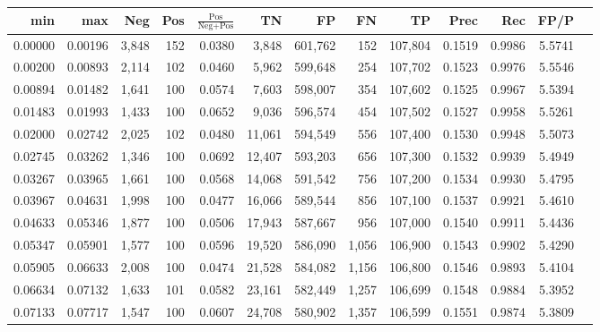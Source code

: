 \begin{tabular}{rrrrrrrrrrrrr}
\toprule
    min &     max &   Neg & Pos & $\frac{\text{Pos}}{\text{Neg}+\text{Pos}}$ &      TN &      FP &      FN &      TP &   Prec &    Rec &   FP/P \\
\midrule
0.00000 & 0.00196 & 3,848 & 152 &                                     0.0380 &   3,848 & 601,762 &     152 & 107,804 & 0.1519 & 0.9986 & 5.5741 \\
0.00200 & 0.00893 & 2,114 & 102 &                                     0.0460 &   5,962 & 599,648 &     254 & 107,702 & 0.1523 & 0.9976 & 5.5546 \\
0.00894 & 0.01482 & 1,641 & 100 &                                     0.0574 &   7,603 & 598,007 &     354 & 107,602 & 0.1525 & 0.9967 & 5.5394 \\
0.01483 & 0.01993 & 1,433 & 100 &                                     0.0652 &   9,036 & 596,574 &     454 & 107,502 & 0.1527 & 0.9958 & 5.5261 \\
0.02000 & 0.02742 & 2,025 & 102 &                                     0.0480 &  11,061 & 594,549 &     556 & 107,400 & 0.1530 & 0.9948 & 5.5073 \\
0.02745 & 0.03262 & 1,346 & 100 &                                     0.0692 &  12,407 & 593,203 &     656 & 107,300 & 0.1532 & 0.9939 & 5.4949 \\
0.03267 & 0.03965 & 1,661 & 100 &                                     0.0568 &  14,068 & 591,542 &     756 & 107,200 & 0.1534 & 0.9930 & 5.4795 \\
0.03967 & 0.04631 & 1,998 & 100 &                                     0.0477 &  16,066 & 589,544 &     856 & 107,100 & 0.1537 & 0.9921 & 5.4610 \\
0.04633 & 0.05346 & 1,877 & 100 &                                     0.0506 &  17,943 & 587,667 &     956 & 107,000 & 0.1540 & 0.9911 & 5.4436 \\
0.05347 & 0.05901 & 1,577 & 100 &                                     0.0596 &  19,520 & 586,090 &   1,056 & 106,900 & 0.1543 & 0.9902 & 5.4290 \\
0.05905 & 0.06633 & 2,008 & 100 &                                     0.0474 &  21,528 & 584,082 &   1,156 & 106,800 & 0.1546 & 0.9893 & 5.4104 \\
0.06634 & 0.07132 & 1,633 & 101 &                                     0.0582 &  23,161 & 582,449 &   1,257 & 106,699 & 0.1548 & 0.9884 & 5.3952 \\
0.07133 & 0.07717 & 1,547 & 100 &                                     0.0607 &  24,708 & 580,902 &   1,357 & 106,599 & 0.1551 & 0.9874 & 5.3809 \\

\end{tabular}

